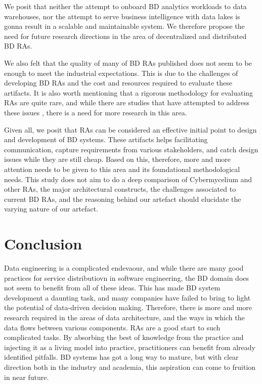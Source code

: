 \documentclass{bmcart}
\begin{document}
We posit that neither the attempt to onboard BD analytics workloads to data warehouses, nor the attempt to serve business intelligence with data lakes is gonna result in a scalable and maintainable system. We therefore propose the need for future research directions in the area of decentralized and distributed BD RAs. 

We also felt that the quality of many of BD RAs published does not seem to be enough to meet the industrial expectations. This is due to the challenges of developing BD RAs and the cost and resources required to evaluate these artifacts. It is also worth mentioning that a rigorous methodology for evaluating RAs are quite rare, and while there are studies that have attempted to address these issues \cite{angelov2008towards}, there is a need for more research in this area.

Given all, we posit that RAs can be considered an effective initial point to design and development of BD systems. These artifacts helps facilitating communication, capture requirements from various stakeholders, and catch design issues while they are still cheap. Based on this, therefore, more and more attention needs to be given to this area and its foundational methodological needs. This study does not aim to do a deep comparison of Cybermycelium and other RAs, the major architectural constructs, the challenges associated to current BD RAs, and the reasoning behind our artefact should elucidate the varying nature of our artefact.

\section{Conclusion} \label{conclusion-section}

Data engineering is a complicated endevaour, and while there are many good practices for service distributiovn in software engineering, the BD domain does not seem to benefit from all of these ideas. This has made BD system development a daunting task, and many companies have failed to bring to light the potential of data-driven decision making. Therefore, there is more and more research required in the areas of data architecture, and the ways in which the data flows between various components. RAs are a good start to such complicated tasks. By absorbing the best of knowledge from the practice and injecting it as a living model into practice, practitioners can benefit from already identified pitfalls. BD systems has got a long way to mature, but with clear direction both in the industry and academia, this aspiration can come to fruition in near future.
\end{document}
